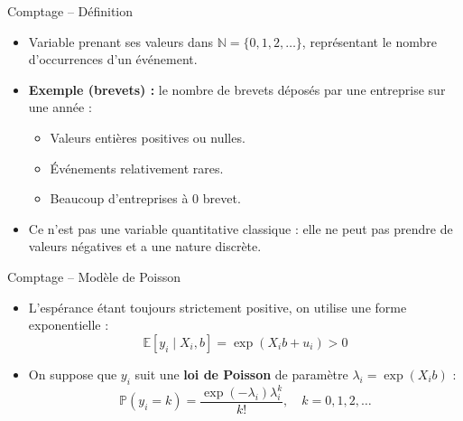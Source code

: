 \documentclass[11pt,aspectratio=169]{beamer}
\newcommand{\E}{\mathbb{E}}
\newcommand{\Prob}{\mathbb{P}}
\newcommand{\N}{\mathbb{N}}
\begin{document}
\begin{frame}{Comptage -- Définition}

\begin{itemize}

\item Variable prenant ses valeurs dans $\N = \{0, 1, 2, \ldots\}$, représentant le nombre d'occurrences d'un événement.\newline

\item \textbf{Exemple (brevets) :} le nombre de brevets déposés par une entreprise sur une année :
  \begin{itemize}
  \item Valeurs entières positives ou nulles.
  \item Événements relativement rares.
  \item Beaucoup d'entreprises à 0 brevet.
  \end{itemize}

\item Ce n'est pas une variable quantitative classique : elle ne peut pas prendre de valeurs négatives et a une nature discrète.

\end{itemize}

\end{frame}

\begin{frame}{Comptage -- Modèle de Poisson}

\begin{itemize}

\item L'espérance étant toujours strictement positive, on utilise une forme exponentielle :
  \[
  \E[y_i \mid X_i, b] = \exp(X_i b + u_i) > 0
  \]\newline

\item On suppose que $y_i$ suit une \textbf{loi de Poisson} de paramètre $\lambda_i = \exp(X_i b)$ :
  \[
  \Prob(y_i = k) = \frac{\exp(-\lambda_i) \lambda_i^k}{k!}, \quad k = 0, 1, 2, \ldots
  \]

\end{itemize}

\end{frame}
\end{document}
